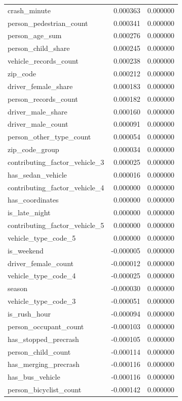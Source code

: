 \begin{tabular}{lrr}
crash_minute & 0.000363 & 0.000000 \\
person_pedestrian_count & 0.000341 & 0.000000 \\
person_age_sum & 0.000276 & 0.000000 \\
person_child_share & 0.000245 & 0.000000 \\
vehicle_records_count & 0.000238 & 0.000000 \\
zip_code & 0.000212 & 0.000000 \\
driver_female_share & 0.000183 & 0.000000 \\
person_records_count & 0.000182 & 0.000000 \\
driver_male_share & 0.000160 & 0.000000 \\
driver_male_count & 0.000091 & 0.000000 \\
person_other_type_count & 0.000054 & 0.000000 \\
zip_code_group & 0.000034 & 0.000000 \\
contributing_factor_vehicle_3 & 0.000025 & 0.000000 \\
has_sedan_vehicle & 0.000016 & 0.000000 \\
contributing_factor_vehicle_4 & 0.000000 & 0.000000 \\
has_coordinates & 0.000000 & 0.000000 \\
is_late_night & 0.000000 & 0.000000 \\
contributing_factor_vehicle_5 & 0.000000 & 0.000000 \\
vehicle_type_code_5 & 0.000000 & 0.000000 \\
is_weekend & -0.000005 & 0.000000 \\
driver_female_count & -0.000012 & 0.000000 \\
vehicle_type_code_4 & -0.000025 & 0.000000 \\
season & -0.000030 & 0.000000 \\
vehicle_type_code_3 & -0.000051 & 0.000000 \\
is_rush_hour & -0.000094 & 0.000000 \\
person_occupant_count & -0.000103 & 0.000000 \\
has_stopped_precrash & -0.000105 & 0.000000 \\
person_child_count & -0.000114 & 0.000000 \\
has_merging_precrash & -0.000116 & 0.000000 \\
has_bus_vehicle & -0.000116 & 0.000000 \\
person_bicyclist_count & -0.000142 & 0.000000 \\

\end{tabular}
